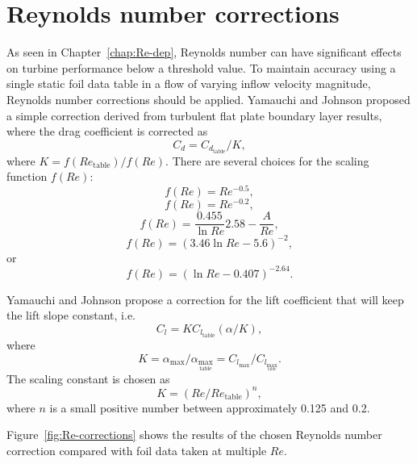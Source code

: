 \section{Reynolds number corrections}

As seen in Chapter~\ref{chap:Re-dep}, Reynolds number can have significant
effects on turbine performance below a threshold value. To maintain accuracy
using a single static foil data table in a flow of varying inflow velocity
magnitude, Reynolds number corrections should be applied. Yamauchi and Johnson
\cite{Yamauchi1983} proposed a simple correction derived from turbulent flat
plate boundary layer results, where the drag coefficient is corrected as
\begin{equation}
    C_d = C_{d_{\mathrm{table}}}/ K,
    \label{eq:cd-correction}
\end{equation}
where $K = f(Re_\mathrm{table})/f(Re)$. There are several choices for the
scaling function $f(Re)$:
\begin{equation}
    f(Re) = Re^{-0.5},
\end{equation}
\begin{equation}
    f(Re) = Re^{-0.2},
\end{equation}
\begin{equation}
    f(Re) = \frac{0.455}{\ln Re}2.58 - \frac{A}{Re},
\end{equation}
\begin{equation}
    f(Re) = (3.46 \ln Re - 5.6)^{-2},
\end{equation}
or
\begin{equation}
    f(Re) = (\ln Re - 0.407)^{-2.64}.
\end{equation}

Yamauchi and Johnson propose a correction for the lift coefficient that will
keep the lift slope constant, i.e.
\begin{equation}
    C_l = K C_{l_\mathrm{table}} (\alpha/K),
\end{equation}
where
\begin{equation}
    K = \alpha_{\max} / \alpha_{\max_\mathrm{table}} = C_{l_{\max}} /
    C_{l_{\max_\mathrm{table}}}.
\end{equation}
The scaling constant is chosen as
\begin{equation}
    K = \left( Re/Re_\mathrm{table} \right)^n,
\end{equation}
where $n$ is a small positive number between approximately 0.125 and 0.2.

Figure~\ref{fig:Re-corrections} shows the results of the chosen Reynolds number
correction compared with foil data taken at multiple $Re$.

